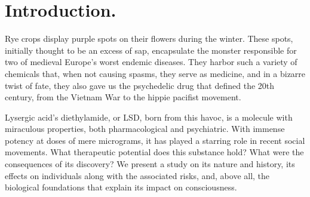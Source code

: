 \section{Introduction.}

Rye crops display purple spots on their flowers during the winter. These spots, initially thought to be an excess of sap, encapsulate the monster responsible for two of medieval Europe's worst endemic diseases. They harbor such a variety of chemicals that, when not causing spasms, they serve as medicine, and in a bizarre twist of fate, they also gave us the psychedelic drug that defined the 20th century, from the Vietnam War to the hippie pacifist movement.

Lysergic acid's diethylamide, or LSD, born from this havoc, is a molecule with miraculous properties, both pharmacological and psychiatric. With immense potency at doses of mere micrograms, it has played a starring role in recent social movements. What therapeutic potential does this substance hold? What were the consequences of its discovery? We present a study on its nature and history, its effects on individuals along with the associated risks, and, above all, the biological foundations that explain its impact on consciousness.

\newpage

